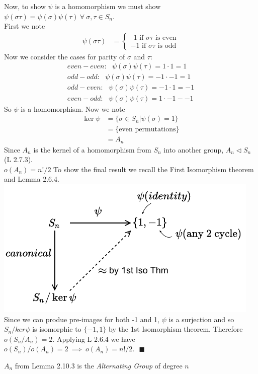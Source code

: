 \begin{lemma}
\noindent Now, to show $\psi$ is a homomorphism we must show $\psi(\sigma\tau)=\psi(\sigma)\psi(\tau) \ \forall \ \sigma,\tau\in S_n$. \\
\noindent First we note 
\begin{align}
    \psi(\sigma\tau) &= \begin{cases}
      \ \ 1 \text{ if $\sigma\tau$ is even} \\
      -1\text{ if $\sigma\tau$ is odd} 
    \end{cases} \nonumber
\end{align}
Now we consider the cases for parity of $\sigma$ and $\tau$:
\begin{align}
    even-even: \ \ \ \psi(\sigma)\psi(\tau)=1\cdot 1 = 1 \nonumber \\
    odd-odd: \ \ \ \psi(\sigma)\psi(\tau)=-1 \cdot -1 = 1 \nonumber \\
    odd-even: \ \ \ \psi(\sigma)\psi(\tau)=-1\cdot 1 = -1 \nonumber \\
    even-odd: \ \ \ \psi(\sigma)\psi(\tau)=1\cdot -1 - -1 \nonumber
\end{align}
So $\psi$ is a homomorphism. Now we note 
\begin{align}
    \ker\psi &= \{\sigma \in S_n | \psi(\sigma) = 1\} \nonumber \\
    &=\{\text{even permutations}\} \nonumber \\
    &= A_n \nonumber
\end{align}
Since $A_n$ is the kernel of a homomorphism from $S_n$ into another group, $A_n \triangleleft S_n$ (L 2.7.3). \\
\noindent $\boxed{o(A_n)=n!/2}$ To show the final result we recall the First Isomorphism theorem and Lemma 2.6.4. \includegraphics[]{Figures/Lem2-10-3.pdf} \\
Since we can produe pre-images for both -1 and 1, $\psi$ is a surjection and so $S_n/ker\psi$ is isomorphic to $\{-1,1\}$ by the 1st Isomorphism theorem. Therefore $o(S_n/A_n)= 2$. Applying L 2.6.4 we have $o(S_n)/o(A_n)=2 \ \implies \ o(A_n)=n!/2. \ \ \ \blacksquare $
\end{lemma}
\begin{definition}
$A_n$ from Lemma 2.10.3 is the \textit{Alternating Group} of degree $n$
\end{definition}

